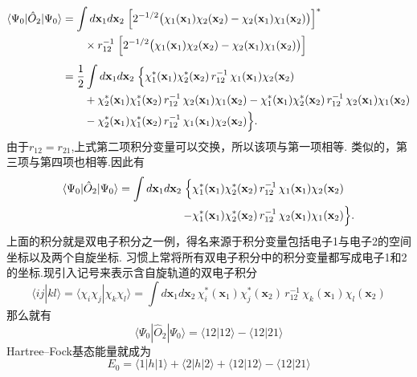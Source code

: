 \documentclass[fontset=none,12pt,a4paper]{ctexart}
\numberwithin{equation}{section}
\begin{document}
\begin{equation}
\begin{aligned}
\langle\Psi_0|\hat{O}_2|\Psi_0\rangle
&= \int d\mathbf{x}_1 d\mathbf{x}_2\;
   \Bigl[ 2^{-1/2} \bigl( \chi_1(\mathbf{x}_1)\chi_2(\mathbf{x}_2)
                         - \chi_2(\mathbf{x}_1)\chi_1(\mathbf{x}_2) \bigr) \Bigr]^* \\
&\qquad \times r_{12}^{-1} \;
   \Bigl[ 2^{-1/2} \bigl( \chi_1(\mathbf{x}_1)\chi_2(\mathbf{x}_2)
                         - \chi_2(\mathbf{x}_1)\chi_1(\mathbf{x}_2) \bigr) \Bigr] \\[4pt]
&= \frac{1}{2} \int d\mathbf{x}_1 d\mathbf{x}_2\;
   \Bigl\{
      \chi_1^*(\mathbf{x}_1)\chi_2^*(\mathbf{x}_2)\, r_{12}^{-1}\,
      \chi_1(\mathbf{x}_1)\chi_2(\mathbf{x}_2) \\
&\qquad + \chi_2^*(\mathbf{x}_1)\chi_1^*(\mathbf{x}_2)\, r_{12}^{-1}\,
      \chi_2(\mathbf{x}_1)\chi_1(\mathbf{x}_2)
      - \chi_1^*(\mathbf{x}_1)\chi_2^*(\mathbf{x}_2)\, r_{12}^{-1}\,
      \chi_2(\mathbf{x}_1)\chi_1(\mathbf{x}_2) \\
&\qquad - \chi_2^*(\mathbf{x}_1)\chi_1^*(\mathbf{x}_2)\, r_{12}^{-1}\,
      \chi_1(\mathbf{x}_1)\chi_2(\mathbf{x}_2)
   \Bigr\}.
\end{aligned}
\label{eq:O2-matrix}
\end{equation}
由于$r_{12}=r_{21}$,上式第二项积分变量可以交换，所以该项与第一项相等.
类似的，第三项与第四项也相等.因此有
\begin{equation}
  \begin{aligned}
  \langle\Psi_0|\hat{O}_2|\Psi_0\rangle
  = \int d\mathbf{x}_1 d\mathbf{x}_2\;
    \Bigl\{&
      \chi_1^*(\mathbf{x}_1)\chi_2^*(\mathbf{x}_2)\, r_{12}^{-1}\,
      \chi_1(\mathbf{x}_1)\chi_2(\mathbf{x}_2) \\
      - &\chi_1^*(\mathbf{x}_1)\chi_2^*(\mathbf{x}_2)\, r_{12}^{-1}\,
      \chi_2(\mathbf{x}_1)\chi_1(\mathbf{x}_2)
    \Bigr\}.
  \end{aligned}
\end{equation}
上面的积分就是双电子积分之一例，得名来源于积分变量包括电子1与电子2的空间坐标以及两个自旋坐标.
习惯上常将所有双电子积分中的积分变量都写成电子1和2的坐标.现引入记号来表示含自旋轨道的双电子积分
\begin{equation}
  \langle ij|kl\rangle
  =\langle\chi_i \chi_j |\chi_k \chi_l \rangle
  = \int d\mathbf{x}_1 d\mathbf{x}_2\,
     \chi_i^*(\mathbf{x}_1)\chi_j^*(\mathbf{x}_2)\, r_{12}^{-1}\,
     \chi_k(\mathbf{x}_1)\chi_l(\mathbf{x}_2)
\end{equation}
那么就有
\begin{equation}
  \langle\Psi_0|\hat{O}_2|\Psi_0\rangle
  = \langle 12|12\rangle - \langle 12|21\rangle
\end{equation}
Hartree--Fock基态能量就成为
\begin{equation}
  E_0 = \langle 1|h|1\rangle + \langle 2|h|2\rangle + \langle 12|12\rangle - \langle 12|21\rangle
\end{equation}
\end{document}
